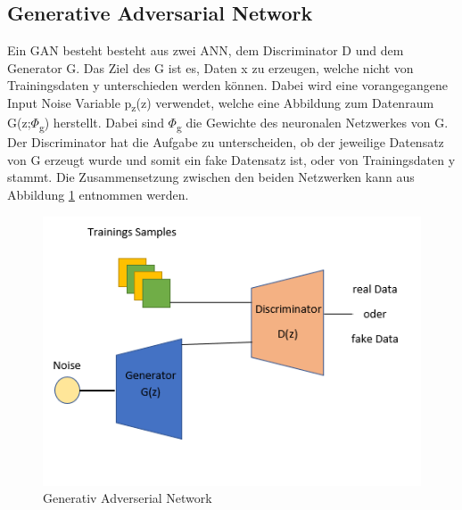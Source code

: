 \documentclass{llncs}
\begin{document}
\subsection{Generative Adversarial Network}

Ein GAN besteht besteht aus zwei ANN, dem Discriminator D und dem Generator G. Das Ziel des G ist es, Daten x zu erzeugen, welche nicht von Trainingsdaten y unterschieden werden können. Dabei wird eine vorangegangene Input Noise Variable p\textsubscript{z}(z) verwendet, welche eine Abbildung zum Datenraum G(z;$\Phi$\textsubscript{g}) herstellt. Dabei sind $\Phi$\textsubscript{g} die Gewichte des neuronalen Netzwerkes von G. Der Discriminator hat die Aufgabe zu unterscheiden, ob der jeweilige Datensatz von G erzeugt wurde und somit ein fake Datensatz ist, oder von Trainingsdaten y stammt\cite{goodfellow2014}. Die Zusammensetzung zwischen den beiden Netzwerken kann aus Abbildung \ref{fig:Bild5} entnommen werden.
\\
\begin{figure}[htbp] 
	\centering
	\includegraphics[width=1.0\textwidth]{GAN_GRUNDAUFBAU.png}
	\caption{Generativ Adverserial Network}
	\label{fig:Bild5}
\end{figure}
\end{document}

